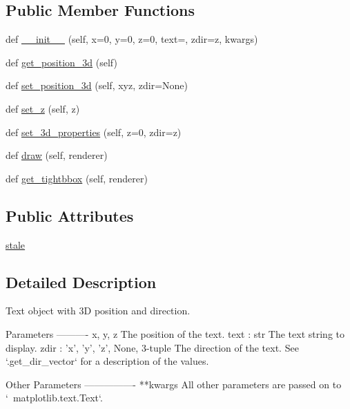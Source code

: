 \subsection*{Public Member Functions}
\begin{DoxyCompactItemize}
\item 
def \hyperlink{classmplot3d_1_1art3d_1_1Text3D_aace87232e3fd048cccc2914c67193e9e}{\+\_\+\+\_\+init\+\_\+\+\_\+} (self, x=0, y=0, z=0, text=\textquotesingle{}\textquotesingle{}, zdir=\textquotesingle{}z\textquotesingle{}, kwargs)
\item 
def \hyperlink{classmplot3d_1_1art3d_1_1Text3D_a966ea8711254d085f04bf43e1ad5cdc2}{get\+\_\+position\+\_\+3d} (self)
\item 
def \hyperlink{classmplot3d_1_1art3d_1_1Text3D_a29de8f88d145d3dbe79082b5d952f7f8}{set\+\_\+position\+\_\+3d} (self, xyz, zdir=None)
\item 
def \hyperlink{classmplot3d_1_1art3d_1_1Text3D_ac534caebaf8ecd50fdddc91243ea0beb}{set\+\_\+z} (self, z)
\item 
def \hyperlink{classmplot3d_1_1art3d_1_1Text3D_ab281f8a6a5a914a111127dd83ac7cee1}{set\+\_\+3d\+\_\+properties} (self, z=0, zdir=\textquotesingle{}z\textquotesingle{})
\item 
def \hyperlink{classmplot3d_1_1art3d_1_1Text3D_ad16fa092ad954867e68d09c37adc6f39}{draw} (self, renderer)
\item 
def \hyperlink{classmplot3d_1_1art3d_1_1Text3D_ad477d21adce76f8054b6f9175d62b553}{get\+\_\+tightbbox} (self, renderer)
\end{DoxyCompactItemize}
\subsection*{Public Attributes}
\begin{DoxyCompactItemize}
\item 
\hyperlink{classmplot3d_1_1art3d_1_1Text3D_a8ba93465d7b4ccba7fbda621e9a0adaf}{stale}
\end{DoxyCompactItemize}


\subsection{Detailed Description}
\begin{DoxyVerb}Text object with 3D position and direction.

Parameters
----------
x, y, z
    The position of the text.
text : str
    The text string to display.
zdir : {'x', 'y', 'z', None, 3-tuple}
    The direction of the text. See `.get_dir_vector` for a description of
    the values.

Other Parameters
----------------
**kwargs
     All other parameters are passed on to `~matplotlib.text.Text`.\end{DoxyVerb}
 

